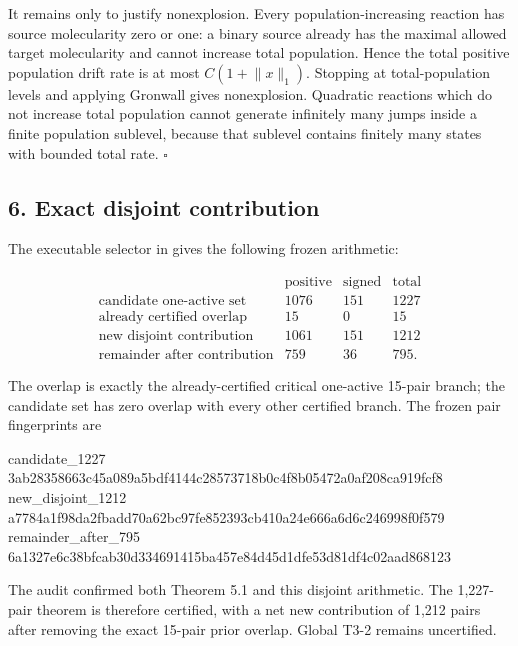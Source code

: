 It remains only to justify nonexplosion. Every population-increasing
reaction has source molecularity zero or one: a binary source already
has the maximal allowed target molecularity and cannot increase total
population. Hence the total positive population drift rate is at most
\(C(1+\lVert x\rVert_1)\). Stopping at total-population levels and
applying Gronwall gives nonexplosion. Quadratic reactions which do not
increase total population cannot generate infinitely many jumps inside a
finite population sublevel, because that sublevel contains finitely many
states with bounded total rate. \(\square\)

\subsection{6. Exact disjoint
contribution}

The executable selector in
\texttt{} gives the
following frozen arithmetic:

\[
\begin{array}{c|r|r|r}
&\text{positive}&\text{signed}&\text{total}\\ \hline
\text{candidate one-active set}&1076&151&1227\\
\text{already certified overlap}&15&0&15\\
\text{new disjoint contribution}&1061&151&1212\\
\text{remainder after contribution}&759&36&795.
\end{array}                                         \tag{6.1}
\]

The overlap is exactly the already-certified critical one-active 15-pair
branch; the candidate set has zero overlap with every other certified
branch. The frozen pair fingerprints are

\begin{CodeBlock}
candidate_1227       3ab28358663c45a089a5bdf4144c28573718b0c4f8b05472a0af208ca919fcf8
new_disjoint_1212    a7784a1f98da2fbadd70a62bc97fe852393cb410a24e666a6d6c246998f0f579
remainder_after_795  6a1327e6c38bfcab30d334691415ba457e84d45d1dfe53d81df4c02aad868123
\end{CodeBlock}

The audit confirmed both Theorem 5.1 and this disjoint arithmetic. The
1,227-pair theorem is therefore certified, with a net new contribution
of 1,212 pairs after removing the exact 15-pair prior overlap. Global
T3-2 remains uncertified.

